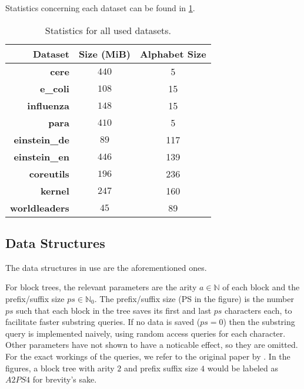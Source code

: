 \documentclass{scrartcl}
\begin{document}
Statistics concerning each dataset can be found in \cref{tab:03:datastats}.

\begin{table}
	\caption{Statistics for all used datasets.}
	\label{tab:03:datastats}
	\centering
	\begin{tabular}[c]{r|c|c}
		\textbf{Dataset}      & \textbf{Size (MiB)} & \textbf{Alphabet Size} \\\hline\hline
		\textbf{cere}         & $440$               & 5                      \\
		\textbf{e\_coli}      & $108$               & 15                     \\
		\textbf{influenza}    & $148$               & 15                     \\
		\textbf{para}         & $410$               & 5                      \\
		\textbf{einstein\_de} & $89$                & 117                    \\
		\textbf{einstein\_en} & $446$               & 139                    \\
		\textbf{coreutils}    & $196$               & 236                    \\
		\textbf{kernel}       & $247$               & 160                    \\
		\textbf{worldleaders} & $45$                & 89                     \\
	\end{tabular}
\end{table}

\subsection{Data Structures}

The data structures in use are the aforementioned ones.

For block trees, the relevant parameters are the arity $a \in \mathbb{N}$ of each block and the prefix/suffix size $ps \in \mathbb{N}_0$.
The prefix/suffix size (PS in the figure) is the number $ps$ such that each block in the tree saves its first and last $ps$ characters each, to facilitate faster substring queries.
If no data is saved ($ps = 0$) then the substring query is implemented naively, using random access queries for each character.
Other parameters have not shown to have a noticable effect, so they are omitted.
For the exact workings of the queries, we refer to the original paper by \citeauthor{belazzougui_block_2021} \cite{belazzougui_block_2021}.
In the figures, a block tree with arity $2$ and prefix suffix size $4$ would be labeled as $A2PS4$ for brevity's sake.
\end{document}
